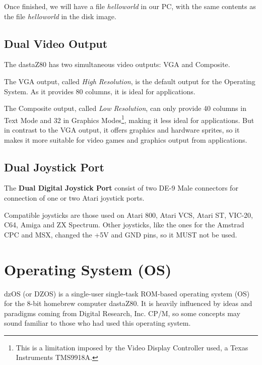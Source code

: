 \documentclass[a4paper,11pt]{article}
\begin{document}
    Once finished, we will have a file \textit{helloworld} in our PC, with the
    same contents as the file \textit{helloworld} in the disk image.

    \subsection{Dual Video Output}

    The dastaZ80 has two simultaneous video outputs: VGA and Composite.

    The VGA output, called \textit{High Resolution}, is the default output for
    the Operating System. As it provides 80 columns, it is ideal for
    applications.

    The Composite output, called \textit{Low Resolution}, can only provide 40
    columns in Text Mode and 32 in Graphics Modes\footnote{This is a limitation
    imposed by the Video Display Controller used, a Texas Instruments TMS9918A.},
    making it less ideal for applications. But in contrast to the VGA output, it
    offers graphics and hardware sprites, so it makes it more suitable for video
    games and graphics output from applications.

    \subsection{Dual Joystick Port}
    The \textbf{Dual Digital Joystick Port} consist of two DE-9 Male connectors
    for connection of one or two Atari joystick ports.

    Compatible joysticks are those used on Atari 800, Atari VCS, Atari ST,
    VIC-20, C64, Amiga and ZX Spectrum. Other joysticks, like the ones for the
    Amstrad CPC and MSX, changed the +5V and GND pins, so it MUST not be used.

    \pagebreak
    \section{Operating System (OS)}
    dzOS (or DZOS) is a single-user single-task ROM-based operating system (OS)
    for the 8-bit homebrew computer dastaZ80. It is heavily influenced by ideas
    and paradigms coming from Digital Research, Inc. CP/M, so some concepts may
    sound familiar to those who had used this operating system.
\end{document}
